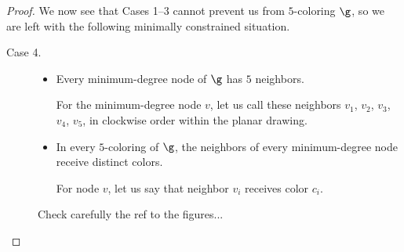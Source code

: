 \begin{proof}
\noindent
We now see that Cases 1--3 cannot prevent us from $5$-coloring $\g$, so
we are left with the following minimally constrained situation.
\begin{description}
\item[{\sf Case 4}.]
\begin{itemize}
\item
Every minimum-degree node of $\g$ has $5$ neighbors.

For the minimum-degree node $v$, let us call these neighbors $v_1$,
$v_2$, $v_3$, $v_4$, $v_5$, in clockwise order within the planar
drawing.
\item
In every $5$-coloring of $\g$, the neighbors of every minimum-degree
node receive distinct colors.

For node $v$, let us say that neighbor $v_i$ receives color $c_i$.
\end{itemize}
{\Denis Check carefully the ref to the figures...}


\end{description}
\end{proof}
